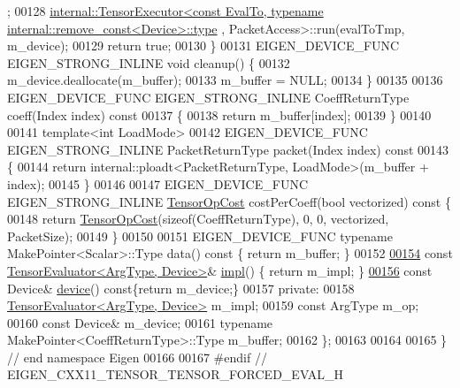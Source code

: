 \begin{DoxyCode}
      ;
00128     
      \hyperlink{class_eigen_1_1internal_1_1_tensor_executor}{internal::TensorExecutor<const EvalTo, typename internal::remove\_const<Device>::type}
      , PacketAccess>::run(evalToTmp, m\_device);
00129     \textcolor{keywordflow}{return} \textcolor{keyword}{true};
00130   \}
00131   EIGEN\_DEVICE\_FUNC EIGEN\_STRONG\_INLINE \textcolor{keywordtype}{void} cleanup() \{
00132     m\_device.deallocate(m\_buffer);
00133     m\_buffer = NULL;
00134   \}
00135 
00136   EIGEN\_DEVICE\_FUNC EIGEN\_STRONG\_INLINE CoeffReturnType coeff(Index index)\textcolor{keyword}{ const}
00137 \textcolor{keyword}{  }\{
00138     \textcolor{keywordflow}{return} m\_buffer[index];
00139   \}
00140 
00141   \textcolor{keyword}{template}<\textcolor{keywordtype}{int} LoadMode>
00142   EIGEN\_DEVICE\_FUNC EIGEN\_STRONG\_INLINE PacketReturnType packet(Index index)\textcolor{keyword}{ const}
00143 \textcolor{keyword}{  }\{
00144     \textcolor{keywordflow}{return} internal::ploadt<PacketReturnType, LoadMode>(m\_buffer + index);
00145   \}
00146 
00147   EIGEN\_DEVICE\_FUNC EIGEN\_STRONG\_INLINE \hyperlink{class_eigen_1_1_tensor_op_cost}{TensorOpCost} costPerCoeff(\textcolor{keywordtype}{bool} vectorized)\textcolor{keyword}{ const }\{
00148     \textcolor{keywordflow}{return} \hyperlink{class_eigen_1_1_tensor_op_cost}{TensorOpCost}(\textcolor{keyword}{sizeof}(CoeffReturnType), 0, 0, vectorized, PacketSize);
00149   \}
00150 
00151   EIGEN\_DEVICE\_FUNC \textcolor{keyword}{typename} MakePointer<Scalar>::Type data()\textcolor{keyword}{ const }\{ \textcolor{keywordflow}{return} m\_buffer; \}
00152 
\hyperlink{struct_eigen_1_1_tensor_evaluator_3_01const_01_tensor_forced_eval_op_3_01_arg_type_00_01_make_pointer___01_4_00_01_device_01_4_ab3202fdd99e83bf2bd678ef11d37341e}{00154}   \textcolor{keyword}{const} \hyperlink{struct_eigen_1_1_tensor_evaluator}{TensorEvaluator<ArgType, Device>}& \hyperlink{struct_eigen_1_1_tensor_evaluator_3_01const_01_tensor_forced_eval_op_3_01_arg_type_00_01_make_pointer___01_4_00_01_device_01_4_ab3202fdd99e83bf2bd678ef11d37341e}{impl}() \{ \textcolor{keywordflow}{return} m\_impl; \}
\hyperlink{struct_eigen_1_1_tensor_evaluator_3_01const_01_tensor_forced_eval_op_3_01_arg_type_00_01_make_pointer___01_4_00_01_device_01_4_a8cfc74b439783ec96b54f9a34a101b5f}{00156}   \textcolor{keyword}{const} Device& \hyperlink{struct_eigen_1_1_tensor_evaluator_3_01const_01_tensor_forced_eval_op_3_01_arg_type_00_01_make_pointer___01_4_00_01_device_01_4_a8cfc74b439783ec96b54f9a34a101b5f}{device}()\textcolor{keyword}{ const}\{\textcolor{keywordflow}{return} m\_device;\}
00157  \textcolor{keyword}{private}:
00158   \hyperlink{struct_eigen_1_1_tensor_evaluator}{TensorEvaluator<ArgType, Device>} m\_impl;
00159   \textcolor{keyword}{const} ArgType m\_op;
00160   \textcolor{keyword}{const} Device& m\_device;
00161   \textcolor{keyword}{typename} MakePointer<CoeffReturnType>::Type m\_buffer;
00162 \};
00163 
00164 
00165 \} \textcolor{comment}{// end namespace Eigen}
00166 
00167 \textcolor{preprocessor}{#endif // EIGEN\_CXX11\_TENSOR\_TENSOR\_FORCED\_EVAL\_H}
\end{DoxyCode}
